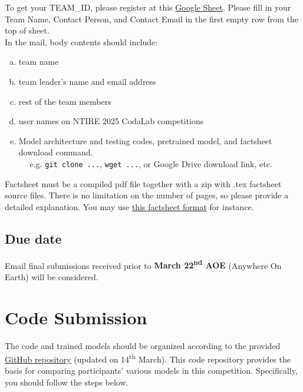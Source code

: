 \documentclass[10pt,twocolumn,letterpaper]{article}
\begin{document}
To get your TEAM\_ID, please register at this \href{https://docs.google.com/spreadsheets/d/11U3h07nikI69hwjAORpajRZEMAw7sfWMjveoLgcinc0/edit?usp=sharing}{Google Sheet}. Please fill in your Team Name, Contact Person, and Contact Email in the first empty row from the top of sheet. \\

In the mail, body contents should include: 

\begin{enumerate}[a)]
\item team name 

\item team leader's name and email address 

\item rest of the team members 

\item user names on NTIRE 2025 CodaLab competitions 

\item Model architecture and testing codes, pretrained model, and factsheet download command.\\
\indent~~ e.g. \texttt{git clone ...}, \texttt{wget ...}, or Google Drive download link, etc.

\end{enumerate}



\noindent Factsheet must be a compiled pdf file together with a zip with .tex factsheet source files. There is no limitation on the number of pages, so please provide a detailed explanation. You may use \href{https://github.com/Eve-ctr/RawFusion/tree/main/Factsheet/Factsheet_latex.zip}{this factsheet format} for instance.

\subsection{Due date}
Email final submissions received prior to \textbf{March 22\textsuperscript{nd} AOE} (Anywhere On Earth) will be considered.



\section{Code Submission}

The code and trained models should be organized according to the provided \href{https://github.com/Eve-ctr/RawFusion}{GitHub repository} (updated on 14\textsuperscript{th} March). This code repository provides the basis for comparing participants' various models in this competition. Specifically, you should follow the steps below. \\
\end{document}

